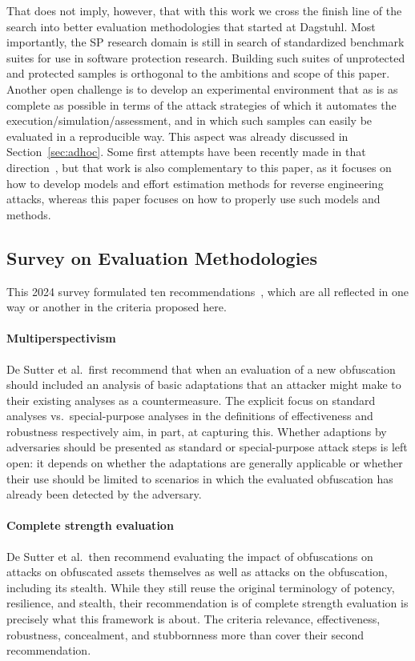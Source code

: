 That does not imply, however, that with this work we cross the finish line of the search into better evaluation methodologies that started at Dagstuhl. Most importantly, the SP research domain is still in search of standardized benchmark suites for use in software protection research. Building such suites of unprotected and protected samples is orthogonal to the ambitions and scope of this paper. Another open challenge is to develop an experimental environment that as is as complete as possible in terms of the attack strategies of which it automates the execution/simulation/assessment, and in which such samples can easily be evaluated in a reproducible way. This aspect was already discussed in Section~\ref{sec:adhoc}. Some first attempts have been recently made in that direction~\cite{checkmate24}, but that work is also complementary to this paper, as it focuses on how to develop models and effort estimation methods for reverse engineering attacks, whereas this paper focuses on how to properly use such models and methods.  

\subsection{Survey on Evaluation Methodologies}

This 2024 survey formulated ten recommendations~\cite{desutter2024evaluation}, which are all reflected in one way or another in the criteria proposed here.

\paragraph{Multiperspectivism} De Sutter et al.\ first recommend that when an evaluation of a new obfuscation should included an analysis of basic adaptations that an attacker might make to their existing analyses as a countermeasure. The explicit focus on standard analyses vs.\ special-purpose analyses in the definitions of effectiveness and robustness respectively aim, in part, at capturing this. Whether adaptions by adversaries should be presented as standard or special-purpose attack steps is left open: it depends on whether the adaptations are generally applicable or whether their use should be limited to scenarios in which the evaluated obfuscation has already been detected by the adversary. 
\paragraph{Complete strength evaluation} De Sutter et al.\ then recommend evaluating the impact of obfuscations on attacks on obfuscated assets themselves as well as attacks on the obfuscation, including its stealth. While they still reuse the original terminology of potency, resilience, and stealth, their recommendation is of complete strength evaluation is precisely what this framework is about. The criteria relevance, effectiveness, robustness, concealment, and stubbornness more than cover their second recommendation.  
